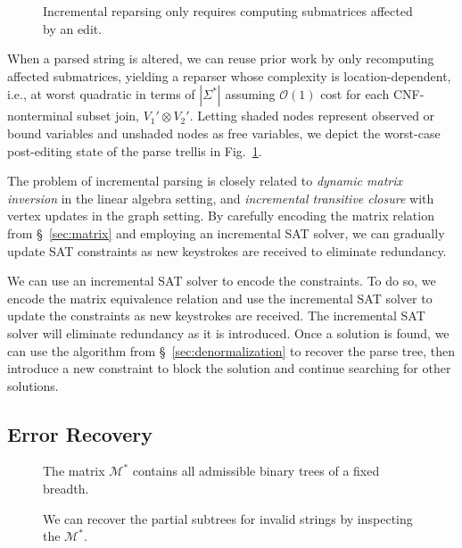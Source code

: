 \documentclass[sigplan,review,anonymous,acmsmall]{acmart}\settopmatter{printfolios=false,printccs=false,printacmref=false}
\begin{document}
\begin{figure}
  \vspace{-13pt}
  \resizebox{.4\textwidth}{!}{}
  \caption{Incremental reparsing only requires computing submatrices affected by an edit.}
  \label{fig:incremental}
\end{figure}

When a parsed string is altered, we can reuse prior work by only recomputing affected submatrices, yielding a reparser whose complexity is location-dependent, i.e., at worst quadratic in terms of $|\Sigma^*|$ assuming $\mathcal{O}(1)$ cost for each CNF-nonterminal subset join, $V_1'\otimes V_2'$. Letting shaded nodes represent observed or bound variables and unshaded nodes as free variables, we depict the worst-case post-editing state of the parse trellis in Fig.~\ref{fig:incremental}.

The problem of incremental parsing is closely related to \textit{dynamic matrix inversion} in the linear algebra setting, and \textit{incremental transitive closure} with vertex updates in the graph setting. By carefully encoding the matrix relation from \S~\ref{sec:matrix} and employing an incremental SAT solver, we can gradually update SAT constraints as new keystrokes are received to eliminate redundancy.

We can use an incremental SAT solver to encode the constraints. To do so, we encode the matrix equivalence relation and use the incremental SAT solver to update the constraints as new keystrokes are received. The incremental SAT solver will eliminate redundancy as it is introduced. Once a solution is found, we can use the algorithm from \S~\ref{sec:denormalization} to recover the parse tree, then introduce a new constraint to block the solution and continue searching for other solutions.

\subsection{Error Recovery}\label{sec:error}

\begin{figure}
  \vspace{-20pt}
  \resizebox{0.4\textwidth}{!}{}
  \caption{The matrix $\mathcal{M}^*$ contains all admissible binary trees of a fixed breadth.}\label{fig:binary_trees}
  \begin{center}
  \resizebox{.35\textwidth}{!}{}
  \end{center}
  \caption{We can recover the partial subtrees for invalid strings by inspecting the $\mathcal{M}^*$.}\label{fig:peaks}
\end{figure}
\end{document}
